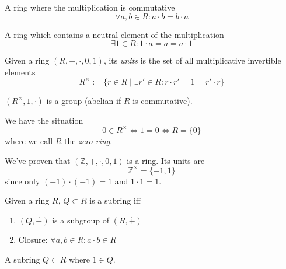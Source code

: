 \begin{definition}
   A ring where the multiplication is commutative
   \[\forall a, b \in R: a \cdot b = b \cdot a\]
\end{definition}

\begin{definition}
   A ring which contains a neutral element of the multiplication
   \[\exists 1 \in R: 1 \cdot a = a = a \cdot 1\]
\end{definition}

\begin{definition}
   Given a ring \((R, +, \cdot, 0, 1)\), its \textit{units} is the set of all multiplicative invertible elements
   \[R^\times := \{r \in R \mid \exists r' \in R: r \cdot r' = 1 = r' \cdot r\}\]
\end{definition}
\begin{remark}
   \((R^{\times}, 1, \cdot)\) is a group (abelian if \(R\) is commutative).
\end{remark}
\begin{remark}
   We have the situation
   \[0 \in R^\times \iff 1 = 0 \iff R = \{0\}\]
   where we call \(R\) the \emph{zero ring}.
\end{remark}
\begin{example}
   We've proven that \((\mathbb{Z}, +, \cdot, 0, 1)\) is a ring.
   Its units are
   \[\mathbb{Z}^\times = \{-1, 1\}\]
   since only \((-1) \cdot (-1) = 1\) and \(1 \cdot 1 = 1\).
\end{example}

\begin{definition}[Subring]
   Given a ring \(R\), \(Q \subset R\) is a subring iff
   \begin{enumerate}[label=\roman*, align=Center]
      \item \((Q, \dotplus)\) is a subgroup of \((R, \dotplus)\)
      \item Closure: \(\forall a, b \in R: a \cdot b \in R\)
   \end{enumerate}
\end{definition}

\begin{definition}
   A subring \(Q \subset R\) where \(1 \in Q\).
\end{definition}

